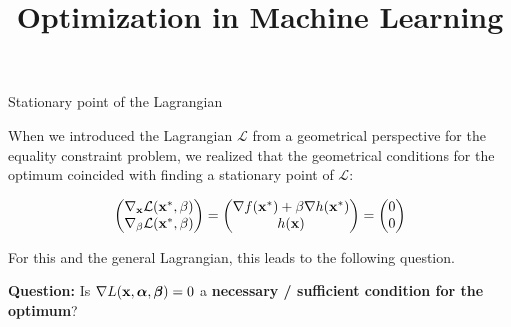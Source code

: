 \documentclass[11pt,compress,t,notes=noshow, xcolor=table]{beamer}
\title{Optimization in Machine Learning}
\date{}
\begin{document}
\sloppy
\begin{vbframe}{Stationary point of the Lagrangian}

When we introduced the Lagrangian $\mathcal{L}$ from a geometrical
perspective for the equality constraint problem, 
we realized that the geometrical conditions for the optimum
coincided with finding a stationary point of $\mathcal{L}$: 

$$
  \begin{pmatrix}
  \nabla_{\mathbf{x}} \mathcal{L}(\mathbf{x}^\ast, \beta) \\
  \nabla_\beta \mathcal{L}(\mathbf{x}^\ast, \beta)
  \end{pmatrix} = \begin{pmatrix} \nabla f(\mathbf{x}^\ast) + \beta \nabla h(\mathbf{x}^\ast) \\
  h(\mathbf{x})
  \end{pmatrix} = \begin{pmatrix}
  0 \\ 0 \end{pmatrix}
$$

\lz

For this and the general Lagrangian, this leads to the following question.
\lz

\textbf{Question: } Is $\nabla L(\mathbf{x}, \bm{\alpha}, \bm{\beta}) = 0$ a \textbf{necessary / sufficient condition for the optimum}?

\end{vbframe}
\end{document}
